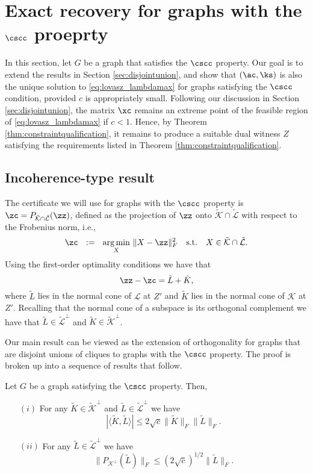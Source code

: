 \section{Exact recovery for graphs with the $\cscc$ proeprty} \label{sec:proof-deterministicrecovery}

In this section, let $G$ be a graph that satisfies the $\cscc$ property.  Our goal is to extend the results in Section \ref{sec:disjointunion}, and show that $(\ac,\ks)$ is also the unique solution to \eqref{eq:lovasz_lambdamax} for graphs satisfying the $\cscc$ condition, provided $c$ is appropriately small.  Following our discussion in Section \ref{sec:disjointunion}, the matrix $\xc$ remains an extreme point of the feasible region of \eqref{eq:lovasz_lambdamax} if $c<1$.  Hence, by Theorem \ref{thm:constraintqualification}, it remains to produce a suitable dual witness $Z$ satisfying the requirements listed in Theorem \ref{thm:constraintqualification}.




\subsection{Incoherence-type result} \label{sec:incoherence}

The certificate we will use  for graphs with the  $\cscc$ property is   $\zc = P_{\tilde{\mathcal{K}} \cap \tilde{\mathcal{L}}} (\zz)$, defined as  the projection of $\zz$ onto $  {\tilde{\mathcal{K}} \cap \tilde{\mathcal{L}}}$ with respect to the Frobenius norm, i.e., 
$$\zc ~~:=~~ \underset{X}{\arg \min} ~\| X - \zz \|_F^2 \quad \mathrm{s.t.} \quad X \in \tilde{\mathcal{K}} \cap \tilde{\mathcal{L}}.$$
Using the first-order optimality conditions we have that 
\begin{equation} 
\zz - \zc = \tilde{L}  + \tilde{K},
\end{equation}
where $\tilde{L}$ lies in the normal cone of $\mathcal{L}$ at $Z'$ and $\tilde{K}$ lies in the normal cone of $\mathcal{K}$ at $Z'$. Recalling that the normal cone of a subspace is its orthogonal complement we have that $\tilde{L}\in \tilde{\mathcal{L}}^\perp$ and $\tilde{K}\in \tilde{\mathcal{K}}^\perp$. 

Our main result  can be viewed as the extension of orthogonality for graphs that are disjoint unions of cliques to graphs with the $\cscc$ property.  The proof is broken up into a sequence of results that follow.


\begin{theorem} 
 \label{thm:incoherence_1}
Let $G$ be a graph satisfying the $\cscc$ property.  Then, 
\begin{itemize}
\item[$(i)$] For any  $\tilde{K} \in \tilde{\mathcal{K}}^\perp$ and  $\tilde{L} \in \tilde{\mathcal{L}}^\perp$ we have   
$$
| \langle \tilde{K}, \tilde{L} \rangle | \leq 2\sqrt{c}\|\tilde{K}\|_F  \|\tilde{L}\|_F .
$$
\item[$(ii)$]  For any  $\tilde{L} \in \tilde{\mathcal{L}}^\perp$ we have 
$$\|P_{\mathcal{K}^\perp}(\tilde{L})\|_F \leq (2 \sqrt{c})^{1/2} \|\tilde{L}\|_F.$$
\end{itemize}
\end{theorem}


